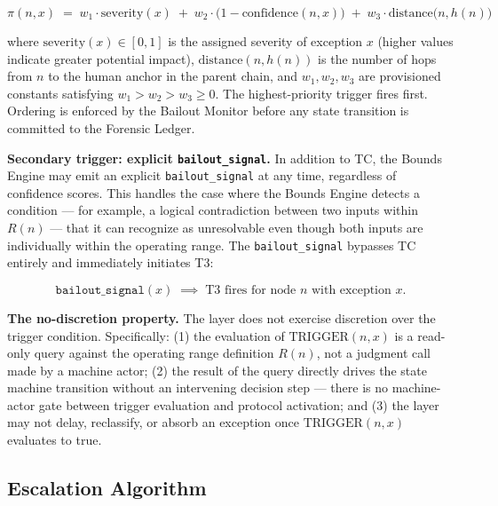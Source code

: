 \begin{equation}
\pi(n, x) \;=\; w_1 \cdot \text{severity}(x) \;+\; w_2 \cdot \bigl(1 - \text{confidence}(n, x)\bigr) \;+\; w_3 \cdot \text{distance}\bigl(n, h(n)\bigr) \tag{PF}
\end{equation}

where $\text{severity}(x) \in [0, 1]$ is the assigned severity of exception $x$ (higher values indicate greater potential impact), $\text{distance}(n, h(n))$ is the number of hops from $n$ to the human anchor in the parent chain, and $w_1, w_2, w_3$ are provisioned constants satisfying $w_1 > w_2 > w_3 \geq 0$. The highest-priority trigger fires first. Ordering is enforced by the Bailout Monitor before any state transition is committed to the Forensic Ledger.

\bigskip
\noindent\textbf{Secondary trigger: explicit \texttt{bailout\_signal}.} In addition to TC, the Bounds Engine may emit an explicit \texttt{bailout\_signal} at any time, regardless of confidence scores. This handles the case where the Bounds Engine detects a condition — for example, a logical contradiction between two inputs within $R(n)$ — that it can recognize as unresolvable even though both inputs are individually within the operating range. The \texttt{bailout\_signal} bypasses TC entirely and immediately initiates T3:

\begin{equation}
\texttt{bailout\_signal}(x) \;\implies\; \text{T3 fires for node } n \text{ with exception } x. \tag{TC-secondary}
\end{equation}

\bigskip
\noindent\textbf{The no-discretion property.} The \bounds{} layer does not exercise discretion over the trigger condition. Specifically: (1) the evaluation of $\text{TRIGGER}(n, x)$ is a read-only query against the operating range definition $R(n)$, not a judgment call made by a machine actor; (2) the result of the query directly drives the state machine transition without an intervening decision step — there is no machine-actor gate between trigger evaluation and protocol activation; and (3) the \bounds{} layer may not delay, reclassify, or absorb an exception once $\text{TRIGGER}(n, x)$ evaluates to true.

\subsection{Escalation Algorithm}\label{sec:escalation-algorithm}

